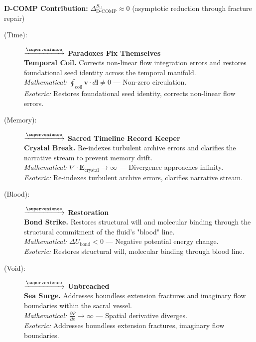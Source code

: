 \textbf{D-COMP Contribution:} $\Delta_{\text{D-COMP}}^{S_{11}} \approx 0$ (asymptotic reduction through fracture repair)

\begin{description}
    \item[(Time):] \fetudrah $\xrightarrow{\supervenience}$ \textbf{Paradoxes Fix Themselves} \\
    \textbf{Temporal Coil.} Corrects non-linear flow integration errors and restores foundational seed identity across the temporal manifold. \\
    \textit{Mathematical:} $\oint_{\text{coil}} \mathbf{v} \cdot d\mathbf{l} \neq 0$ — Non-zero circulation. \\
    \textit{Esoteric:} Restores foundational seed identity, corrects non-linear flow errors.

    \item[(Memory):] \kalzhil $\xrightarrow{\supervenience}$ \textbf{Sacred Timeline Record Keeper} \\
    \textbf{Crystal Break.} Re-indexes turbulent archive errors and clarifies the narrative stream to prevent memory drift. \\
    \textit{Mathematical:} $\nabla \cdot \mathbf{E}_{\text{crystal}} \to \infty$ — Divergence approaches infinity. \\
    \textit{Esoteric:} Re-indexes turbulent archive errors, clarifies narrative stream.

    \item[(Blood):] \babdhtir $\xrightarrow{\supervenience}$ \textbf{Restoration} \\
    \textbf{Bond Strike.} Restores structural will and molecular binding through the structural commitment of the fluid's "blood" line. \\
    \textit{Mathematical:} $\Delta U_{\text{bond}} < 0$ — Negative potential energy change. \\
    \textit{Esoteric:} Restores structural will, molecular binding through blood line.

    \item[(Void):] \ahnkha $\xrightarrow{\supervenience}$ \textbf{Unbreached} \\
    \textbf{Sea Surge.} Addresses boundless extension fractures and imaginary flow boundaries within the sacral vessel. \\
    \textit{Mathematical:} $\frac{\partial \Psi}{\partial x} \to \infty$ — Spatial derivative diverges. \\
    \textit{Esoteric:} Addresses boundless extension fractures, imaginary flow boundaries.


\end{description}
